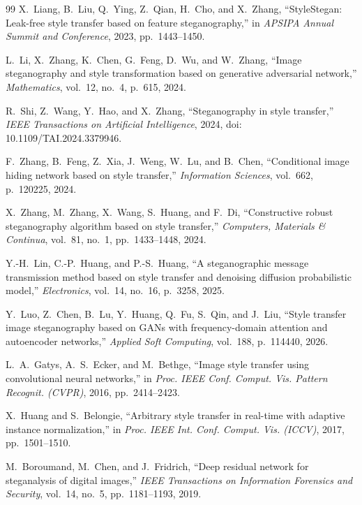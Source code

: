 \documentclass[conference]{IEEEtran}
\begin{document}
\begin{thebibliography}{99}
X.\ Liang, B.\ Liu, Q.\ Ying, Z.\ Qian, H.\ Cho, and X.\ Zhang, ``StyleStegan: Leak-free style transfer based on feature steganography,'' in \emph{APSIPA Annual Summit and Conference}, 2023, pp.\ 1443--1450.

L.\ Li, X.\ Zhang, K.\ Chen, G.\ Feng, D.\ Wu, and W.\ Zhang, ``Image steganography and style transformation based on generative adversarial network,'' \emph{Mathematics}, vol.\ 12, no.\ 4, p.\ 615, 2024.

R.\ Shi, Z.\ Wang, Y.\ Hao, and X.\ Zhang, ``Steganography in style transfer,'' \emph{IEEE Transactions on Artificial Intelligence}, 2024, doi: 10.1109/TAI.2024.3379946.

F.\ Zhang, B.\ Feng, Z.\ Xia, J.\ Weng, W.\ Lu, and B.\ Chen, ``Conditional image hiding network based on style transfer,'' \emph{Information Sciences}, vol.\ 662, p.\ 120225, 2024.

X.\ Zhang, M.\ Zhang, X.\ Wang, S.\ Huang, and F.\ Di, ``Constructive robust steganography algorithm based on style transfer,'' \emph{Computers, Materials \& Continua}, vol.\ 81, no.\ 1, pp.\ 1433--1448, 2024.

Y.-H.\ Lin, C.-P.\ Huang, and P.-S.\ Huang, ``A steganographic message transmission method based on style transfer and denoising diffusion probabilistic model,'' \emph{Electronics}, vol.\ 14, no.\ 16, p.\ 3258, 2025.

Y.\ Luo, Z.\ Chen, B.\ Lu, Y.\ Huang, Q.\ Fu, S.\ Qin, and J.\ Liu, ``Style transfer image steganography based on GANs with frequency-domain attention and autoencoder networks,'' \emph{Applied Soft Computing}, vol.\ 188, p.\ 114440, 2026.

L.~A.\ Gatys, A.~S.\ Ecker, and M.\ Bethge, ``Image style transfer using convolutional neural networks,'' in \emph{Proc. IEEE Conf. Comput. Vis. Pattern Recognit. (CVPR)}, 2016, pp.\ 2414--2423.

X.\ Huang and S.\ Belongie, ``Arbitrary style transfer in real-time with adaptive instance normalization,'' in \emph{Proc. IEEE Int. Conf. Comput. Vis. (ICCV)}, 2017, pp.\ 1501--1510.

M.\ Boroumand, M.\ Chen, and J.\ Fridrich, ``Deep residual network for steganalysis of digital images,'' \emph{IEEE Transactions on Information Forensics and Security}, vol.\ 14, no.\ 5, pp.\ 1181--1193, 2019.


\end{thebibliography}
\end{document}
